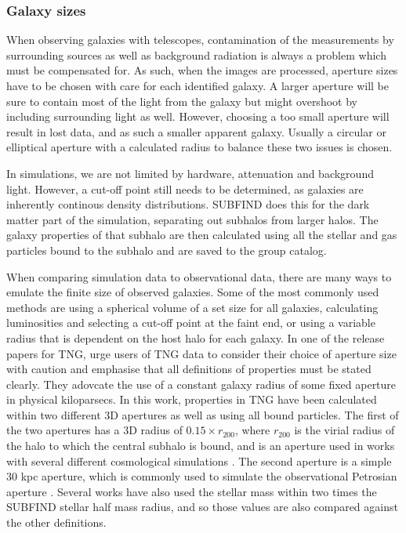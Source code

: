 \subsubsection{Galaxy sizes} \label{galaxy_size}
When observing galaxies with telescopes, contamination of the measurements by surrounding sources as well as background radiation is always a problem which must be compensated for. As such, when the images are processed, aperture sizes have to be chosen with care for each identified galaxy. A larger aperture will be sure to contain most of the light from the galaxy but might overshoot by including surrounding light as well. However, choosing a too small aperture will result in lost data, and as such a smaller apparent galaxy. Usually a circular or elliptical aperture with a calculated radius to balance these two issues is chosen.

In simulations, we are not limited by hardware, attenuation and background light. However, a cut-off point still needs to be determined, as galaxies are inherently continous density distributions. SUBFIND does this for the dark matter part of the simulation, separating out subhalos from larger halos. The galaxy properties of that subhalo are then calculated using all the stellar and gas particles bound to the subhalo and are saved to the group catalog. 

When comparing simulation data to observational data, there are many ways to emulate the finite size of observed galaxies. Some of the most commonly used methods are using a spherical volume of a set size for all galaxies, calculating luminosities and selecting a cut-off point at the faint end, or using a variable radius that is dependent on the host halo for each galaxy. In one of the release papers for TNG, \textcite{Pillepich2017} urge users of TNG data to consider their choice of aperture size with caution and emphasise that all definitions of properties must be stated clearly. They adovcate the use of a constant galaxy radius of some fixed aperture in physical kiloparsecs. In this work, properties in TNG have been calculated within two different 3D apertures as well as using all bound particles. The first of the two apertures has a 3D radius of $0.15 \times r_{200}$, where $r_{200}$ is the virial radius of the halo to which the central subhalo is bound, and is an aperture used in works with several different cosmological simulations \parencite{Ferrero2020}. The second aperture is a simple 30 kpc aperture, which is commonly used to simulate the observational Petrosian aperture \parencite{Schaye2015}. Several works have also used the stellar mass within two times the SUBFIND stellar half mass radius, and so those values are also compared against the other definitions.

